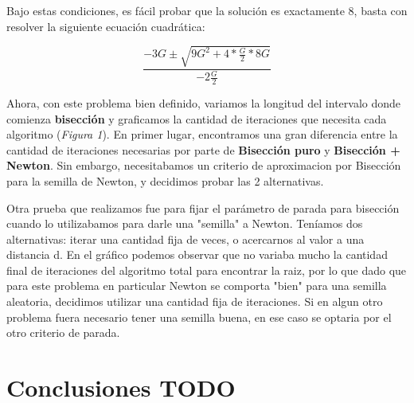 \documentclass[a4paper]{article}
\begin{document}
Bajo estas condiciones, es fácil probar que la solución es exactamente 8, basta con resolver la siguiente ecuación cuadrática:

\begin{displaymath}
  \frac{-3G \pm \sqrt{9G^2 + 4*\frac{G}{2}*8G}}{-2\frac{G}{2}}
\end{displaymath}

Ahora, con este problema bien definido, variamos la longitud del intervalo donde comienza \textbf{bisección} y graficamos la cantidad de iteraciones que necesita cada algoritmo (\textit{Figura 1}).
En primer lugar, encontramos una gran diferencia entre la cantidad de iteraciones necesarias por parte de \textbf{Bisección puro} y \textbf{Bisección + Newton}. Sin embargo, necesitabamos un criterio de aproximacion por Bisección para la semilla de Newton, y decidimos probar las 2 alternativas. 



Otra prueba que realizamos fue para fijar el parámetro de parada para bisección cuando lo utilizabamos para darle una "semilla" a Newton. Teníamos dos alternativas: iterar una cantidad fija de veces, o acercarnos al valor a una distancia d.
En el gráfico podemos observar que no variaba mucho la cantidad final de iteraciones del algoritmo total para encontrar la raiz, por lo que dado que para este problema en particular Newton se comporta "bien" para una semilla aleatoria, decidimos utilizar una cantidad fija de iteraciones.
Si en algun otro problema fuera necesario tener una semilla buena, en ese caso se optaria por el otro criterio de parada.
 
 

\section{Conclusiones TODO}
\end{document}
